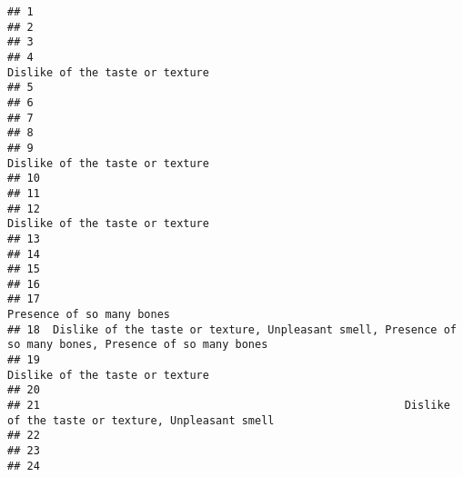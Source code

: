 \documentclass[
]{article}
\begin{document}
\begin{verbatim}
## 1                                                                                                          
## 2                                                                                                          
## 3                                                                                                          
## 4                                                                           Dislike of the taste or texture
## 5                                                                                                          
## 6                                                                                                          
## 7                                                                                                          
## 8                                                                                                          
## 9                                                                           Dislike of the taste or texture
## 10                                                                                                         
## 11                                                                                                         
## 12                                                                          Dislike of the taste or texture
## 13                                                                                                         
## 14                                                                                                         
## 15                                                                                                         
## 16                                                                                                         
## 17                                                                                Presence of so many bones
## 18  Dislike of the taste or texture, Unpleasant smell, Presence of so many bones, Presence of so many bones
## 19                                                                          Dislike of the taste or texture
## 20                                                                                                         
## 21                                                        Dislike of the taste or texture, Unpleasant smell
## 22                                                                                                         
## 23                                                                                                         
## 24                                                                                                         

\end{verbatim}
\end{document}
